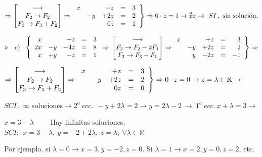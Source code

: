 \begin{miejercicio}
\vspace{2mm} $\Rightarrow
\mqty[\longrightarrow \\ F_2 \to F_2 \\ F_3\to F_3+F_2 ] \Rightarrow
\left.
\begin{array}{rrrcr}
	x&&+z&=&3\\
	&-y&+2z&=&2 \\
	&&0z&=&1
\end{array} \right\}
\Rightarrow 0\cdot z=1 \to \nexists z \to \ SI\, , \ \text{sin solución.}$ 


\vspace{8mm} $\triangleright \quad c)\ \ \left\{
\begin{array}{rrrcr}
     x & & +z & = & 3 
  \\ 2x& -y& +4z & = & 8
  \\ x& +y &-z & = & 1
\end{array}
\right.
\Rightarrow
\left.
\mqty[ \longrightarrow \\ F_2\to F_2-2F_1 \\ F_3\to F_3-F_1  ] \Rightarrow 
\begin{array}{rrrcr}
	x&&+z&=&3\\
	&-y&+2z&=&2 \\
	&y&-2z&=&-1	
\end{array}
\right\} \Rightarrow$

\vspace{2mm} $\Rightarrow
\mqty[\longrightarrow \\ F_2 \to F_2 \\ F_3\to F_3+F_2 ] \Rightarrow
\left.
\begin{array}{rrrcr}
	x&&+z&=&3\\
	&-y&+2z&=&2 \\
	&&0z&=&0
\end{array} \right\}
\Rightarrow 0\cdot z=0 \to  z=\lambda \in \mathbb R \to $

\vspace{2mm} $ SCI\, , \ \infty \text{ soluciones} \to 2^a \ ecc.\ \ -y+2\lambda=2 \to y=2\lambda - 2 \ \to \ 1^a \ ecc. \ x+\lambda = 3 \to $

\vspace{2mm} $x=3-\lambda\qquad$ Hay infinitas soluciones, $SCI:\ \  x=3-\lambda,\ y=-2+2\lambda,\ z=\lambda;\ \forall \lambda \in \mathbb R$ 

\vspace{2mm} Por ejemplo, si $\lambda=0 \to x=3,y=-2,z=0$. Si $\lambda=1\to x=2,y=0,z=2$, etc.

\end{miejercicio}


